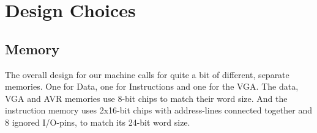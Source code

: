 \section {Design Choices}

\subsection {Memory}
The overall design for our machine calls for quite a bit of different, separate memories. One for Data,
one for Instructions and one for the VGA. The data, VGA and AVR memories use 8-bit chips to match
their word size. And the instruction memory uses 2x16-bit chips with address-lines connected
together and 8 ignored I/O-pins, to match its 24-bit word size.
\begin{comment}
Tok dette ut siden dette allerede er diskutert tidligere i rapporten
~Mads

One of the
earliest design choices that led to this was the decision to have separate instruction/data-memories.
The reasoning behind this choice being that we could avoid the bottleneck that would be introduced
from sharing memories.
\end{comment}

\begin{comment}
Skrev om for å skille ut prosess
~Mads

Since the requirements for the data/instruction memories differed in both size and word-width 
we wound up with not only separate, but also different chips for this purpose (The data-memory required
8-bit words, the instruction-width was 24-bit, and since we wanted to avoid using multiple memory accesses
to get a complete instruction, we needed a wide enough memory chip for that purpose. 24-bit chips were out of
production, and 32-bit memory was too expensive, thus the solution became 2x16-bit chips with their address-lines
connected together and 8 ignored I/O-pins, effectively making them a 24-bit memory).

Since we wanted to reduce the sharing of memories as much as possible, we also needed a separate memory for
our \ac{VGA} controller, as that needed to read it's buffer as fast as possible without interfering with the speed
of the rest of the system. This called for a memory that was big enough to hold at least a full screen-frame,
at 8-bit per pixel (since each pixel is an 8-bit greyscale pixel).

To reduce the possibility of having too slow data-access from the AVR, an extra memory was added to work as
a buffer for the AVR as well. This design choice was made {\em after} ordering, which meant that we had to choose from
the chips we had already ordered to fit this purpose. Since this was intended to carry data intended for the rest
of the system, and as the rest of the system is working with data in 8-bit bytes, we ended up using one of the
extra chips ordered as \ac{VGA} memory for this purpose.

Forresten, da vart det så kort at jeg bare tødde det in i avsnittet over. Må få jobbet prosess-delene inn igjen et eller annet sted!
~Mads
\end{comment}

